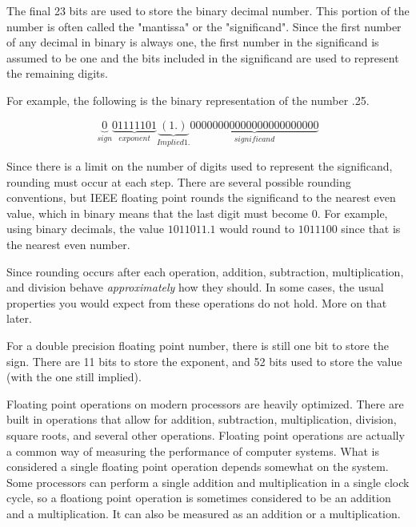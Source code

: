 The final 23 bits are used to store the binary decimal number.
This portion of the number is often called the "mantissa" or the "significand".
Since the first number of any decimal in binary is always one, the first number in the significand is assumed to be one and the bits included in the significand are used to represent the remaining digits.

For example, the following is the binary representation of the number .25.

\begin{equation*}
\underbrace{0}_{sign} \underbrace{01111101}_{exponent}\underbrace{(1.)}_{Implied 1.} \underbrace{00000000000000000000000}_{significand}
\end{equation*}

Since there is a limit on the number of digits used to represent the significand, rounding must occur at each step.
There are several possible rounding conventions, but IEEE floating point rounds the significand to the nearest even value, which in binary means that the last digit must become 0.
For example, using binary decimals, the value $1011011.1$ would round to $1011100$ since that is the nearest even number.

Since rounding occurs after each operation, addition, subtraction, multiplication, and division behave \textit{approximately} how they should.
In some cases, the usual properties you would expect from these operations do not hold.
More on that later.

For a double precision floating point number, there is still one bit to store the sign.
There are 11 bits to store the exponent, and 52 bits used to store the value (with the one still implied).

Floating point operations on modern processors are heavily optimized.
There are built in operations that allow for addition, subtraction, multiplication, division, square roots, and several other operations.
Floating point operations are actually a common way of measuring the performance of computer systems.
What is considered a single floating point operation depends somewhat on the system.
Some processors can perform a single addition and multiplication in a single clock cycle, so a floationg point operation is sometimes considered to be an addition and a multiplication.
It can also be measured as an addition or a multiplication.

